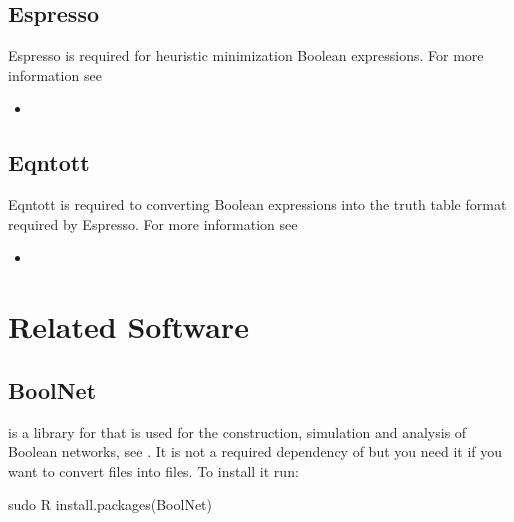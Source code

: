 \documentclass[letterpaper,10pt,english]{sphinxmanual}
\begin{document}
\subsection{Espresso}
\label{\detokenize{Installation:espresso}}\label{\detokenize{Installation:installation-espresso}}
Espresso is required for heuristic minimization Boolean expressions.
For more information see
\begin{itemize}
\item {} 

\end{itemize}


\subsection{Eqntott}
\label{\detokenize{Installation:eqntott}}\label{\detokenize{Installation:installation-eqntott}}
Eqntott is required to converting Boolean expressions into the truth table format required by Espresso.
For more information see
\begin{itemize}
\item {} 

\end{itemize}


\section{Related Software}
\label{\detokenize{Installation:related-software}}

\subsection{BoolNet}
\label{\detokenize{Installation:boolnet}}\label{\detokenize{Installation:installation-boolnet}}
 is a library for  that is used for the construction, simulation and analysis of Boolean networks, see {\hyperref[\detokenize{Bibliography:mussel2010}]{}}.
It is not a required dependency of  but you need it if you want to convert  files into  files.
To install it run:

\begin{sphinxVerbatim}[commandchars=\\\{\}]
\PYGZdl{} sudo R
\PYGZgt{} install.packages(\PYGZdq{}BoolNet\PYGZdq{})
\end{sphinxVerbatim}
\end{document}
